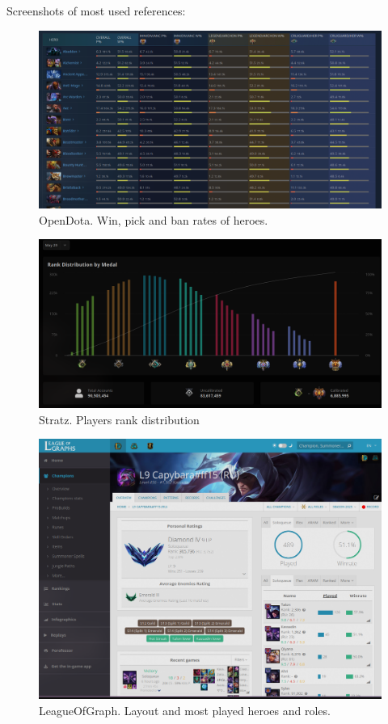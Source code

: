         Screenshots of most used references:

    \begin{figure}[ht]
        \centering
        \includegraphics[width=1\textwidth]{images/references/OpenDota1}
        \caption{OpenDota. Win, pick and ban rates of heroes.}
    \end{figure}

    \begin{figure}[ht]
        \centering
        \includegraphics[width=1\textwidth]{images/references/Stratz}
        \caption{Stratz. Players rank distribution}
    \end{figure}

    \begin{figure}[ht]
        \centering
        \includegraphics[width=1\textwidth]{images/references/LoG}
        \caption{LeagueOfGraph. Layout and most played heroes and roles.}
    \end{figure}

